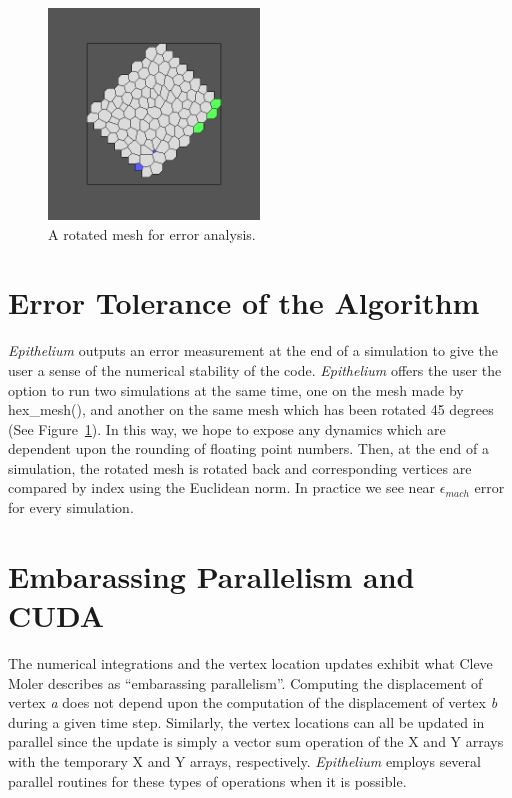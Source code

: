 \begin{figure}[hr]
\centering
\includegraphics[width=0.5\textwidth]{../diagrams/rotate.png}
\caption{A rotated mesh for error analysis.}
\label{fig:rotate}
\end{figure}

\section{Error Tolerance of the Algorithm}
\emph{Epithelium} outputs an error measurement at the end of a simulation to give the user a sense of the numerical stability of the code. \emph{Epithelium} offers the user the option to run two simulations at the same time, one on the mesh made by hex\_mesh(), and another on the same mesh which has been rotated 45 degrees (See Figure~\ref{fig:rotate}). In this way, we hope to expose any dynamics which are dependent upon the rounding of floating point numbers. Then, at the end of a simulation, the rotated mesh is rotated back and corresponding vertices are compared by index using the Euclidean norm. In practice we see near $\epsilon_{mach}$ error for every simulation.

\section{Embarassing Parallelism and CUDA}
The numerical integrations and the vertex location updates exhibit what Cleve Moler describes as ``embarassing parallelism''. Computing the displacement of vertex \emph{a} does not depend upon the computation of the displacement of vertex \emph{b} during a given time step. Similarly, the vertex locations can all be updated in parallel since the update is simply a vector sum operation of the X and Y arrays with the temporary X and Y arrays, respectively. \emph{Epithelium} employs several parallel routines for these types of operations when it is possible. 

